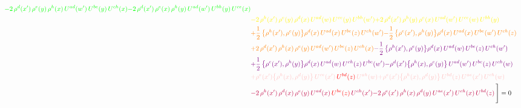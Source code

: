 \documentclass[9pt]{article}
\numberwithin{equation}{section}
\begin{document}
\begin{align}
{\color{green}-2\,\rho^{d}(x')\,\rho^{e}(y)\, \rho^{h}(x)\,U^{ad}(w')\,U^{be}(y)\,U^{ch}(x)}{\color{green}-2\,\rho^{d}(x')\,\rho^{e}(x)\, \rho^{h}(y)\,U^{ad}(w')\,U^{bh}(y)\,U^{ce}(x)}\notag \\ & {\color{yellow}-2\,\rho^{h}(x')\,\rho^{e}(y)\,\rho^{d}(x)\,U^{ad}(w)\,U^{ce}(y)\,U^{bh}(w')}{\color{yellow}+2\,\rho^{d}(x')\,\rho^{h}(y)\, \rho^{e}(x)\,U^{ad}(w')\,U^{ce}(w)\,U^{bh}(y)}\notag \\ & {\color{orange}+\frac{1}{2}\,\big\{\rho^{h}(x'),\rho^{e}(y)\big\}\rho^{d}(x)\,U^{ad}(x)\,U^{be}(z)\,U^{ch}(w')}{\color{orange}-\frac{1}{2}\,\big\{\rho^{e}(x'),\rho^{h}(y)\big\}\rho^{d}(x)\,U^{ad}(x)\,U^{be}(w')\,U^{ch}(z)}\notag \\ & {\color{orange}+2\,\rho^{d}(x')\,\rho^{h}(x)\, \rho^{e}(y)\,U^{ad}(w')\,U^{be}(z)\,U^{ch}(x)} {\color{violet}-\frac{1}{2}\,\big\{\rho^{h}(x'),\rho^{e}(y)\big\}\rho^{d}(x)\,U^{ad}(w)\,U^{be}(z)\,U^{ch}(w')}\notag \\ & {\color{violet}+\frac{1}{2}\,\big\{\rho^{e}(x'),\rho^{h}(y)\big\}\rho^{d}(x)\,U^{ad}(w)\,U^{ch}(z)\,U^{be}(w')}{\color{violet}-\rho^{d}(x')\big\{\rho^{h}(x),\rho^{e}(y)\big\}\,U^{ad}(w')\,U^{be}(z)\,U^{ch}(w)}\notag \\ & {\color{pink}+\rho^{e}(x')\big\{\rho^{h}(x),\rho^{d}(y)\big\}\,U^{ce}(x')\,{\color{red}U^{bd}(z)}\,U^{ah}(w)}{\color{pink}+\rho^{e}(x')\big\{\rho^{h}(x),\rho^{d}(y)\big\}\,U^{bd}(z)\,U^{ae}(x')\,U^{ch}(w)}\notag \\ & {\color{purple}-2\,\rho^{h}(x')\,\rho^{d}(x)\,\rho^{e}(y)\,U^{ad}(x)\,{\color{red}U^{be}(z)}\,U^{ch}(x')}{\color{purple}-2\,\rho^{e}(x')\,\rho^{h}(x)\, \rho^{d}(y)\,U^{ae}(x')\,U^{ch}(x)\,U^{bd}(z)}\,\Bigg] = 0
\end{align}    
\end{document}
